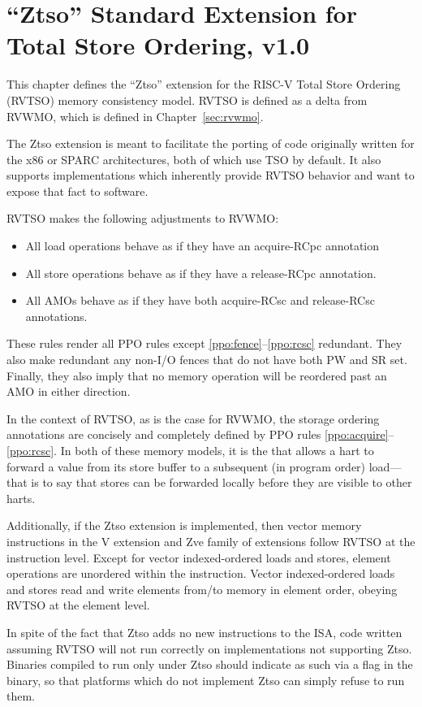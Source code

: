 \chapter{``Ztso'' Standard Extension for Total Store Ordering, v1.0}
\label{sec:ztso}

This chapter defines the ``Ztso'' extension for the RISC-V Total Store Ordering (RVTSO) memory consistency model.
RVTSO is defined as a delta from RVWMO, which is defined in Chapter~\ref{sec:rvwmo}.

\begin{commentary}
  The Ztso extension is meant to facilitate the porting of code originally written for the x86 or SPARC architectures, both of which use TSO by default.
  It also supports implementations which inherently provide RVTSO behavior and want to expose that fact to software.
\end{commentary}

RVTSO makes the following adjustments to RVWMO:

\begin{itemize}
  \item All load operations behave as if they have an acquire-RCpc annotation
  \item All store operations behave as if they have a release-RCpc annotation.
  \item All AMOs behave as if they have both acquire-RCsc and release-RCsc annotations.
\end{itemize}

\begin{commentary}
  These rules render all PPO rules except \ref{ppo:fence}--\ref{ppo:rcsc} redundant.
  They also make redundant any non-I/O fences that do not have both PW and SR set.
  Finally, they also imply that no memory operation will be reordered past an AMO in either direction.
  
  In the context of RVTSO, as is the case for RVWMO, the storage ordering annotations are concisely and completely defined by PPO rules \ref{ppo:acquire}--\ref{ppo:rcsc}. In both of these memory models, it is the  that allows a hart to forward a value from its store buffer to a subsequent (in program order) load---that is to say that stores can be forwarded locally before they are visible to other harts.
\end{commentary}

Additionally, if the Ztso extension is implemented, then vector memory
instructions in the V extension and Zve family of extensions follow RVTSO at
the instruction level.
Except for vector indexed-ordered loads and stores,
element operations are unordered within the instruction.
Vector indexed-ordered loads and stores read and write elements from/to memory
in element order, obeying RVTSO at the element level.

In spite of the fact that Ztso adds no new instructions to the ISA, code written assuming RVTSO will not run correctly on implementations not supporting Ztso.
Binaries compiled to run only under Ztso should indicate as such via a flag in the binary, so that platforms which do not implement Ztso can simply refuse to run them.
